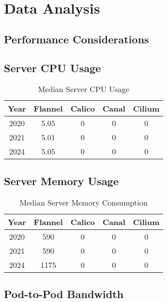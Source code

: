 %
%

\pagebreak
\section{Data Analysis}

\onehalfspacing

\subsection{Performance Considerations}

\subsection{Server CPU Usage}

\begin{table}[H]
\caption{Median Server CPU Usage}
\begin{tabular}{|c | c | c | c | c|} 
 \hline
 Year & Flannel & Calico & Canal & Cilium \\
 \hline\hline
 2020 & 5.05 & 0 & 0 & 0 \\ 
 \hline
 2021 & 5.01 & 0 & 0 & 0 \\
 \hline
 2024 & 5.05 & 0 & 0 & 0 \\
 \hline
\end{tabular}
\label{tab:cpu}
\end{table}

\subsection{Server Memory Usage}

\begin{table}[H]
\caption{Median Server Memory Consumption}
\begin{tabular}{|c | c | c | c | c|} 
 \hline
 Year & Flannel & Calico & Canal & Cilium \\
 \hline\hline
 2020 & 590 & 0 & 0 & 0 \\ 
 \hline
 2021 & 590 & 0 & 0 & 0 \\
 \hline
 2024 & 1175 & 0 & 0 & 0 \\
 \hline
\end{tabular}
\label{tab:mem}
\end{table}

\subsection{Pod-to-Pod Bandwidth}

